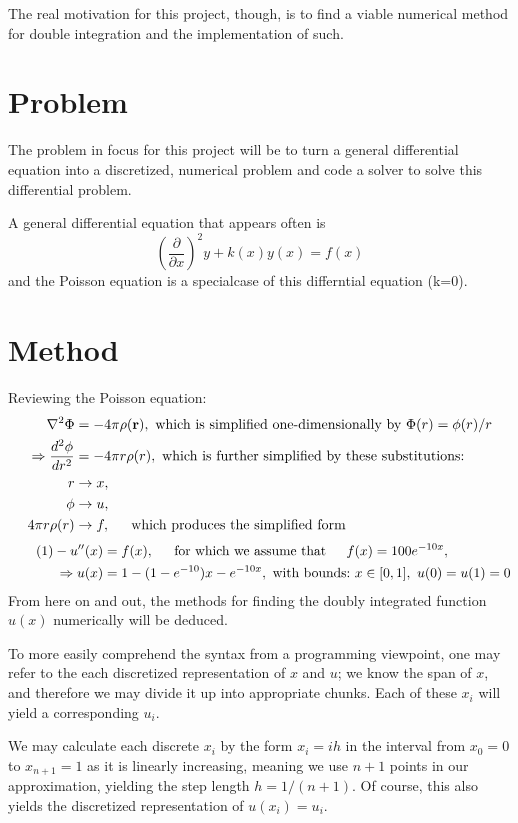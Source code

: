 \documentclass[11pt,a4paper,notitlepage]{article}
\newcommand\pd[2]{\frac{\partial #1}{\partial #2}}
\begin{document}
The real motivation for this project, though, is to find a viable numerical method for double integration and the implementation of such.

\section{Problem}
The problem in focus for this project will be to turn a general differential equation into a discretized, numerical problem and code a solver to solve this differential problem. 

A general differential equation that appears often is $$\left(\pd{ }{x}\right)^2 y + k(x)y(x) = f(x)$$ and the Poisson equation is a specialcase of this differntial equation (k=0).

\section{Method}
\label{section:method}

Reviewing the Poisson equation:
\begin{align*}
\nabla ^2 \Phi &= -4\pi\rho(\mathbf{r}), \ \text{which is simplified one-dimensionally by} \ \Phi(r) = \phi(r)/r \\
\Rightarrow \frac{d^2 \phi}{dr^2} &= -4\pi r \rho(r), \ \text{which is further simplified by these substitutions:}\\
r &\rightarrow x, \\
\phi &\rightarrow u,\\
4\pi r\rho(r) &\rightarrow f, \indent \text{which produces the simplified form}
\end{align*}\begin{align*}\label{eq:1}\tag{1}
-u''(x) &= f(x), \indent \text{for which we assume that} \indent f(x) = 100e^{-10x}, \\
\Rightarrow u(x) &= 1- (1-e^{-10})x - e^{-10x},\ \text{with bounds:}\ x \in [0,1],\ u(0) = u(1)= 0
\end{align*}
From here on and out, the methods for finding the doubly integrated function $u(x)$ numerically will be deduced.

To more easily comprehend the syntax from a programming viewpoint, one may refer to the each discretized representation of $x$ and $u$; we know the span of $x$, and therefore we may divide it up into appropriate chunks. Each of these $x_i$ will yield a corresponding $u_i$.

We may calculate each discrete $x_i$ by the form $x_i = ih$ in the interval from $x_0 = 0$ to $x_{n+1} = 1$ as it is linearly increasing, meaning we use $n+1$ points in our approximation, yielding the step length $h = 1/(n+1)$. Of course, this also yields the discretized representation of $u(x_i) = u_i$.
\end{document}
